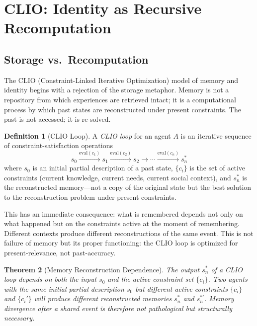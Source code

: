\documentclass[12pt, oneside]{article}
\theoremstyle{plain}
\newtheorem{theorem}{Theorem}[section]
\theoremstyle{definition}
\newtheorem{definition}[theorem]{Definition}
\theoremstyle{remark}
\begin{document}
\section{CLIO: Identity as Recursive Recomputation}

\subsection{Storage vs.\ Recomputation}

The CLIO (Constraint-Linked Iterative Optimization) model of memory
and identity begins with a rejection of the storage metaphor. Memory
is not a repository from which experiences are retrieved intact;
it is a computational process by which past states are
reconstructed under present constraints. The past is not accessed;
it is re-solved.

\begin{definition}[CLIO Loop]
A \emph{CLIO loop} for an agent $A$ is an iterative sequence of
constraint-satisfaction operations
\[
  s_0 \xrightarrow{\mathrm{eval}(c_1)} s_1
     \xrightarrow{\mathrm{eval}(c_2)} s_2
     \xrightarrow{\phantom{aa}} \cdots
     \xrightarrow{\mathrm{eval}(c_n)} s_n^*
\]
where $s_0$ is an initial partial description of a past state,
$\{c_i\}$ is the set of active constraints (current knowledge,
current needs, current social context), and $s_n^*$ is the
reconstructed memory---not a copy of the original state but the
best solution to the reconstruction problem under present
constraints.
\end{definition}

This has an immediate consequence: what is remembered depends not
only on what happened but on the constraints active at the moment
of remembering. Different contexts produce different reconstructions
of the same event. This is not failure of memory but its proper
functioning: the CLIO loop is optimized for present-relevance, not
past-accuracy.

\begin{theorem}[Memory Reconstruction Dependence]
\label{thm:memory-reconstruction}
The output $s_n^*$ of a CLIO loop depends on both the input $s_0$
and the active constraint set $\{c_i\}$. Two agents with the same
initial partial description $s_0$ but different active constraints
$\{c_i\}$ and $\{c_i'\}$ will produce different reconstructed
memories $s_n^*$ and $s_n^{*\prime}$. Memory divergence after a
shared event is therefore not pathological but structurally
necessary.
\end{theorem}
\end{document}

